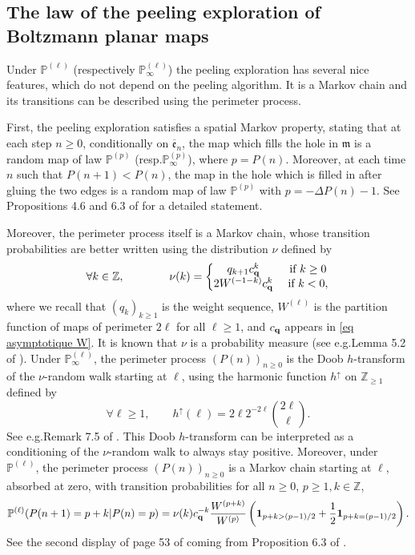 \documentclass[11pt]{article}
\numberwithin{equation}{section}
\def \Z{\mathbb{Z}}
\def\P{\mathbb{P}}
\begin{document}
\subsection{The law of the peeling exploration of Boltzmann planar maps}\label{sous-section loi de l'explo}
Under $\P^{(\ell)}$ (respectively $\P^{(\ell)}_\infty$) the peeling exploration has several nice features, which do not depend on the peeling algorithm. It is a Markov chain and its transitions can be described using the perimeter process.

First, the peeling exploration satisfies a spatial Markov property, stating that at each step $n\ge 0$, conditionally on $\overline{\mathfrak{e}}_n$, the map which fills the hole in $\mathfrak{m}$ is a random map of law $\P^{(p)}$ (resp.\@ $\P_\infty^{(p)}$), where $p= P(n)$. Moreover, at each time $n$ such that $P(n+1)< P(n)$, the map in the hole which is filled in after gluing the two edges is a random map of law $\P^{(p)}$ with $p = -\Delta P(n)-1$. See Propositions 4.6 and 6.3 of \cite{StFlour} for a detailed statement.

Moreover, the perimeter process itself is a Markov chain, whose transition probabilities are better written using the distribution $\nu$ defined by
\begin{equation}\label{eq def nu}
\forall k \in \Z,
\qquad
\qquad
\nu(k) = 
\left\{
\begin{matrix}
	q_{k+1} c_{\bf q}^k &\text{ if } k \ge 0 \\
	2 W^{(-1-k)} c_{\bf q}^k &\text{ if } k < 0,
\end{matrix}
\right.
\end{equation}
where we recall that $(q_k)_{k\ge 1}$ is the weight sequence, $W^{(\ell)}$ is the partition function of maps of perimeter $2\ell$ for all $\ell \ge 1$, and $c_{\bf q}$ appears in \eqref{eq asymptotique W}. 
It is known that $\nu $ is a probability measure (see e.g.\@ Lemma 5.2 of \cite{StFlour}). Under $\P^{(\ell)}_\infty$, the perimeter process $(P(n))_{n\ge 0}$ is the Doob $h$-transform of the $\nu$-random walk starting at $\ell$, using the harmonic function $h^\uparrow$ on $\Z_{\ge 1}$ defined by
\begin{equation}\label{eq h fleche}
\forall \ell \ge 1, \qquad 
h^\uparrow (\ell) = 2 \ell 2^{-2\ell} \binom{2\ell}{\ell}.
\end{equation}
See e.g.\@ Remark 7.5 of \cite{StFlour}. This Doob $h$-transform can be interpreted as a conditioning of the $\nu$-random {walk} to always stay positive. {Moreover}, under $\P^{(\ell)}$, the perimeter process $(P(n))_{n\ge 0}$ is a Markov chain starting at $\ell$, absorbed at zero, with transition probabilities for all $n\ge 0$, $p \ge 1, k \in \Z$,
\begin{equation}\label{eq probas de transition perimetre fini}
\P^{(\ell)}(P(n+1)= p+k \vert P(n) = p)
= \nu(k) c_{\bf q}^{-k}\frac{ W^{(p+k)}}{W^{(p)}} \left({\bf 1}_{p+k> (p-1)/2} +
\frac{1}{2} {\bf 1}_{p+k= (p-1)/2}
\right).
\end{equation}
See the second display of page 53 of \cite{BBCK} coming from Proposition 6.3  of \cite{BBCK}.
\end{document}
